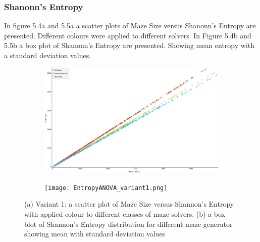  \subsubsection{Shanonn's Entropy}
In figure 5.4a and 5.5a a scatter plots of Maze Size versus Shanonn's Entropy are presented. Different colours were applied to different solvers. In Figure 5.4b
and 5.5b a box plot of Shanonn's Entropy are presented. Showing mean entropy with a standard deviation values.
    \begin{figure}[!h]
        \centering
        \begin{subfigure}[!h]{0.4\textwidth}
           \includegraphics[scale = 0.15]{EntropyVsSize_variant1.png}
           \caption{}
        \end{subfigure}
        \begin{subfigure}[!h]{0.6\textwidth}
           \texttt{[image: EntropyANOVA\_variant1.png]}
           \caption{}
        \end{subfigure}
        \caption{(a) Variant 1: a scatter plot of Maze Size versus Shannon's Entropy with applied colour to different classes of maze solvers.
        (b) a box blot of Shannon's Entropy distribution for different maze generator showing mean with standard deviation values}
        \end{figure}

